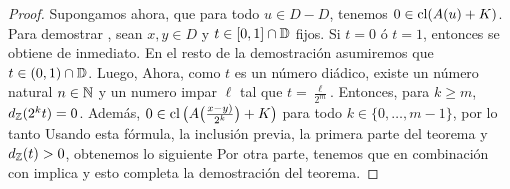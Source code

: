 \begin{proof}
	Supongamos ahora, que para todo $u\in D-D$, tenemos $0\in\mathop{\hbox{\rm cl}}\nolimits(A(u) + K)$.
	Para demostrar , sean $x,y\in D$ y $t\in[0,1]\cap\mathbb{D}$ fijos.
	Si $t=0$ \'o $t=1$, entonces  se obtiene de inmediato.
	En el resto de la demostraci\'on asumiremos que $t\in(0,1)\cap\mathbb{D}$.
	Luego,
	Ahora, como $t$ es un n\'umero di\'adico, existe un n\'umero natural $n\in\mathbb{N}$
	y un numero impar $\ell$ tal que $t=\frac{\ell}{2^m}$. Entonces, para $k\geq  m$,
	$d_{\mathbb{Z}}(2^kt)=0$. Adem\'as, $0\in\mathop{\hbox{\rm cl}}\nolimits\big(A\big(\frac{x-y)}{2^k}\big)+K\big)$
	para todo $k\in\{0,\dots,m-1\}$, por lo tanto
	Usando esta f\'ormula, la inclusi\'on previa, la primera parte del teorema y
	 $d_{\mathbb{Z}}(t)>0$, obtenemos lo siguiente
	Por otra parte, tenemos
	que en combinaci\'on con  implica  y esto completa
	la demostraci\'on del teorema.
\end{proof}

